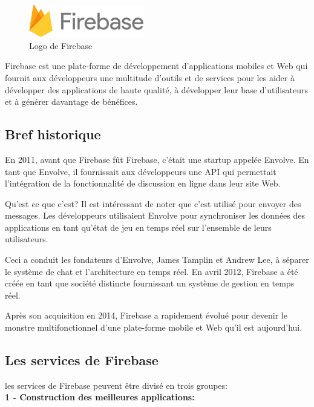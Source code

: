 \begin{figure}
	\includegraphics[width=5cm]{Images/chapter2/firebase_logo.png}
	\vspace{-20pt}
	\caption{{\footnotesize Logo de Firebase}}
\end{figure}

Firebase est une plate-forme de développement d'applications mobiles et Web qui fournit aux développeurs une multitude d'outils et de services pour les aider à développer des applications de haute qualité, à développer leur base d'utilisateurs et à générer davantage de bénéfices.\cite{geekyants_introduction_2017}
\newpage

\subsection{Bref historique}
En 2011, avant que Firebase fût Firebase, c'était une startup appelée Envolve. En tant que Envolve, il fournissait aux développeurs une \gls{API} qui permettait l'intégration de la fonctionnalité de discussion en ligne dans leur site Web.

Qu'est ce que c'est? Il est intéressant de noter que c'est utilisé pour envoyer des messages. Les développeurs utilisaient Envolve pour synchroniser les données des applications en tant qu'état de jeu en temps réel sur l'ensemble de leurs utilisateurs.

Ceci a conduit les fondateurs d’Envolve, James Tamplin et Andrew Lee, à séparer le système de chat et l’architecture en temps réel. En avril 2012, Firebase a été créée en tant que société distincte fournissant un système de gestion en temps réel.

Après son acquisition en 2014, Firebase a rapidement évolué pour devenir le monstre multifonctionnel d’une plate-forme mobile et Web qu’il est aujourd’hui.

\subsection{Les services de Firebase}
les services de Firebase peuvent être divisé en trois groupes:\bigskip\\
\longtab \textbf{1 - Construction des meilleures applications:}\bigskip

